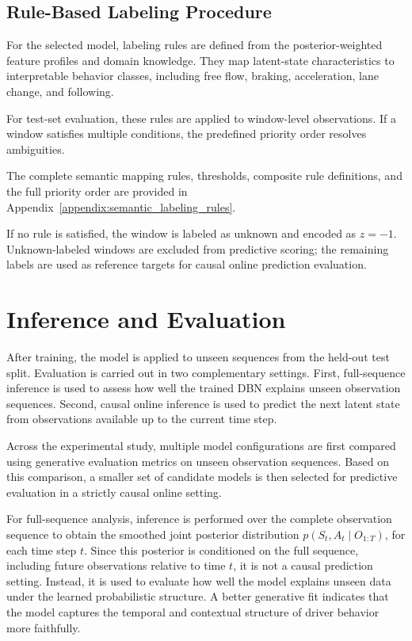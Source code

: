 \subsection{Rule-Based Labeling Procedure}
\label{subsec:rule_based_labeling}

For the selected model, labeling rules are defined from the posterior-weighted feature profiles and domain knowledge.
They map latent-state characteristics to interpretable behavior classes, including free flow, braking, acceleration, lane change, and following.

\par For test-set evaluation, these rules are applied to window-level observations.
If a window satisfies multiple conditions, the predefined priority order resolves ambiguities.

The complete semantic mapping rules, thresholds, composite rule definitions, and the full priority order are provided in Appendix~\ref{appendix:semantic_labeling_rules}. 

If no rule is satisfied, the window is labeled as unknown and encoded as $z=-1$.
Unknown-labeled windows are excluded from predictive scoring; the remaining labels are used as reference targets for causal online prediction evaluation.





\section{Inference and Evaluation}
\label{sec:inference_evaluation}
After training, the model is applied to unseen sequences from the held-out test split.
Evaluation is carried out in two complementary settings. 
First, full-sequence inference is used to assess how well the trained \ac{DBN} explains unseen observation sequences. 
Second, causal online inference is used to predict the next latent state from observations available up to the current time step. 

\par Across the experimental study, multiple model configurations are first compared using generative evaluation metrics on unseen observation sequences.
Based on this comparison, a smaller set of candidate models is then selected for predictive evaluation in a strictly causal online setting.


\par For full-sequence analysis, inference is performed over the complete observation sequence to obtain the smoothed joint posterior distribution
$
p(S_t, A_t \mid O_{1:T})$, 
for each time step \(t\).    
Since this posterior is conditioned on the full sequence, including future observations relative to time \(t\), it is not a causal prediction setting. 
Instead, it is used to evaluate how well the model explains unseen data under the learned probabilistic structure.   
A better generative fit indicates that the model captures the temporal and contextual structure of driver behavior more faithfully. 
  
